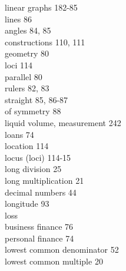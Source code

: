 \documentclass[10pt]{article}
\begin{document}
linear graphs 182-85\\
lines 86\\
angles 84, 85\\
constructions 110, 111\\
geometry 80\\
loci 114\\
parallel 80\\
rulers 82, 83\\
straight 85, 86-87\\
of symmetry 88\\
liquid volume, measurement 242\\
loans 74\\
location 114\\
locus (loci) 114-15\\
long division 25\\
long multiplication 21\\
decimal numbers 44\\
longitude 93\\
loss\\
business finance 76\\
personal finance 74\\
lowest common denominator 52\\
lowest common multiple 20
\end{document}
